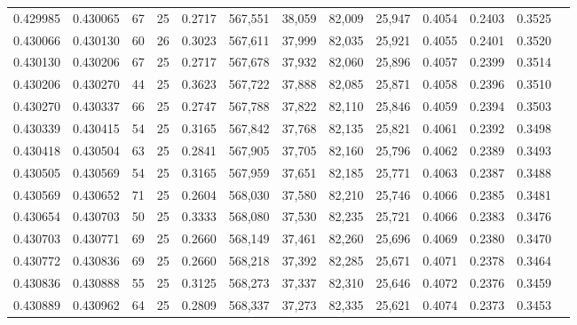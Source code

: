 \begin{tabular}{rrrrrrrrrrrrr}
0.429985 & 0.430065 &    67 &  25 &                                     0.2717 & 567,551 &  38,059 &  82,009 &  25,947 & 0.4054 & 0.2403 & 0.3525 \\
0.430066 & 0.430130 &    60 &  26 &                                     0.3023 & 567,611 &  37,999 &  82,035 &  25,921 & 0.4055 & 0.2401 & 0.3520 \\
0.430130 & 0.430206 &    67 &  25 &                                     0.2717 & 567,678 &  37,932 &  82,060 &  25,896 & 0.4057 & 0.2399 & 0.3514 \\
0.430206 & 0.430270 &    44 &  25 &                                     0.3623 & 567,722 &  37,888 &  82,085 &  25,871 & 0.4058 & 0.2396 & 0.3510 \\
0.430270 & 0.430337 &    66 &  25 &                                     0.2747 & 567,788 &  37,822 &  82,110 &  25,846 & 0.4059 & 0.2394 & 0.3503 \\
0.430339 & 0.430415 &    54 &  25 &                                     0.3165 & 567,842 &  37,768 &  82,135 &  25,821 & 0.4061 & 0.2392 & 0.3498 \\
0.430418 & 0.430504 &    63 &  25 &                                     0.2841 & 567,905 &  37,705 &  82,160 &  25,796 & 0.4062 & 0.2389 & 0.3493 \\
0.430505 & 0.430569 &    54 &  25 &                                     0.3165 & 567,959 &  37,651 &  82,185 &  25,771 & 0.4063 & 0.2387 & 0.3488 \\
0.430569 & 0.430652 &    71 &  25 &                                     0.2604 & 568,030 &  37,580 &  82,210 &  25,746 & 0.4066 & 0.2385 & 0.3481 \\
0.430654 & 0.430703 &    50 &  25 &                                     0.3333 & 568,080 &  37,530 &  82,235 &  25,721 & 0.4066 & 0.2383 & 0.3476 \\
0.430703 & 0.430771 &    69 &  25 &                                     0.2660 & 568,149 &  37,461 &  82,260 &  25,696 & 0.4069 & 0.2380 & 0.3470 \\
0.430772 & 0.430836 &    69 &  25 &                                     0.2660 & 568,218 &  37,392 &  82,285 &  25,671 & 0.4071 & 0.2378 & 0.3464 \\
0.430836 & 0.430888 &    55 &  25 &                                     0.3125 & 568,273 &  37,337 &  82,310 &  25,646 & 0.4072 & 0.2376 & 0.3459 \\
0.430889 & 0.430962 &    64 &  25 &                                     0.2809 & 568,337 &  37,273 &  82,335 &  25,621 & 0.4074 & 0.2373 & 0.3453 \\

\end{tabular}
